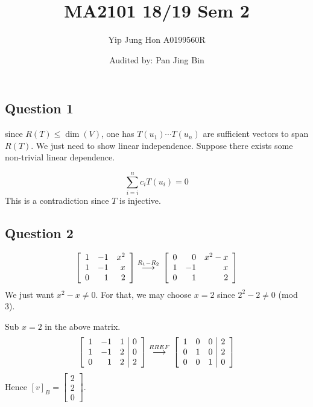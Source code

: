 \documentclass{article}
\title{MA2101 18/19 Sem 2}
\author{Yip Jung Hon A0199560R}
\date{Audited by: Pan Jing Bin}
\newcommand{\grstep}[2][\relax]{%
   \ensuremath{\mathrel{
       {\mathop{\longrightarrow}\limits^{#2\mathstrut}_{
                                     \begin{subarray}{l} #1 \end{subarray}}}}}}
\begin{document}
\maketitle
\subsection*{Question 1}
since $R(T) \leq \dim(V)$, one has $T(u_1) \cdots T(u_n)$ are sufficient vectors to span $R(T)$. We just need to show linear independence. Suppose there exists some non-trivial linear dependence.

\begin{equation*}
    \sum_{i=i}^n c_i T(u_i) = 0
\end{equation*}
This is a contradiction since $T$ is injective.

\subsection*{Question 2}
\begin{align*}
  \left[\begin{array}{rrr}
1 & -1 & x^2 \\
1 & -1 & x \\
0 & 1 & 2
\end{array}\right] \grstep{R_1-R_2}{}  \left[\begin{array}{rrr}
0 & 0 & x^2-x \\
1 & -1 & x \\
0 & 1 & 2
\end{array}\right]
\end{align*}
We just want $x^2-x \neq 0$. For that, we may choose $x=2$ since $2^2-2 \neq 0$ (mod 3). 

Sub $x=2$ in the above matrix.
\begin{align*}
    \left[\begin{array}{rrr|r}
1 & -1 & 1 & 0\\
1 & -1 & 2 & 0\\
0 & 1 & 2 & 2 
\end{array}\right] \grstep{RREF}{} \left[\begin{array}{rrr|r}
1 & 0 & 0 & 2\\
0 & 1 & 0 & 2\\
0 & 0 & 1 & 0 
\end{array}\right]
\end{align*}
Hence $[v]_B=\left[\begin{array}{r}
2 \\
2 \\
0  
\end{array}\right] $.
\end{document}
